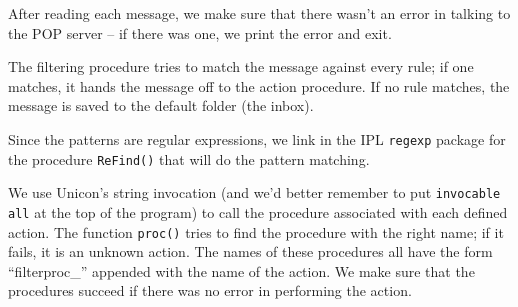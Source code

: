 After reading each message, we make sure that there
wasn't an error in talking to the POP server -- if
there was one, we print the error and exit.

The filtering procedure tries to match the message against every rule;
if one matches, it hands the message off to the action procedure. If no
rule matches, the message is saved to the default folder (the inbox).


Since the patterns are regular expressions, we link in the IPL \texttt{regexp}
package for the procedure \texttt{ReFind()} that will do the pattern
matching.


We use Unicon's string invocation (and
we'd better remember to put \texttt{invocable all} at
the top of the program) to call the procedure associated with each
defined action. The function \texttt{proc()} tries to find the
procedure with the right name; if it fails, it is an unknown action.
The names of these procedures all have the form
{\textquotedblleft}filterproc\_{\textquotedblright} appended with the
name of the action. We make sure that the procedures succeed if there
was no error in performing the action.

